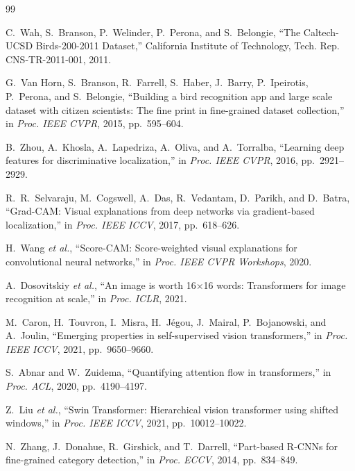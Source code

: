 \documentclass[journal]{IEEEtran}
\begin{document}
\begin{thebibliography}{99}

C.~Wah, S.~Branson, P.~Welinder, P.~Perona, and S.~Belongie,
``The Caltech-UCSD Birds-200-2011 Dataset,''
California Institute of Technology,
Tech. Rep. CNS-TR-2011-001, 2011.

G.~Van Horn, S.~Branson, R.~Farrell, S.~Haber, J.~Barry,
P.~Ipeirotis, P.~Perona, and S.~Belongie,
``Building a bird recognition app and large scale dataset with citizen
scientists: The fine print in fine-grained dataset collection,''
in \emph{Proc. IEEE CVPR}, 2015, pp.~595--604.

B.~Zhou, A.~Khosla, A.~Lapedriza, A.~Oliva, and A.~Torralba,
``Learning deep features for discriminative localization,''
in \emph{Proc. IEEE CVPR}, 2016, pp.~2921--2929.

R.~R.~Selvaraju, M.~Cogswell, A.~Das, R.~Vedantam,
D.~Parikh, and D.~Batra,
``Grad-CAM: Visual explanations from deep networks via gradient-based
localization,''
in \emph{Proc. IEEE ICCV}, 2017, pp.~618--626.

H.~Wang \emph{et al.},
``Score-CAM: Score-weighted visual explanations for convolutional
neural networks,''
in \emph{Proc. IEEE CVPR Workshops}, 2020.

A.~Dosovitskiy \emph{et al.},
``An image is worth 16$\times$16 words: Transformers for image
recognition at scale,''
in \emph{Proc. ICLR}, 2021.

M.~Caron, H.~Touvron, I.~Misra, H.~J\'{e}gou, J.~Mairal,
P.~Bojanowski, and A.~Joulin,
``Emerging properties in self-supervised vision transformers,''
in \emph{Proc. IEEE ICCV}, 2021, pp.~9650--9660.

S.~Abnar and W.~Zuidema,
``Quantifying attention flow in transformers,''
in \emph{Proc. ACL}, 2020, pp.~4190--4197.

Z.~Liu \emph{et al.},
``Swin Transformer: Hierarchical vision transformer using shifted
windows,''
in \emph{Proc. IEEE ICCV}, 2021, pp.~10012--10022.

N.~Zhang, J.~Donahue, R.~Girshick, and T.~Darrell,
``Part-based R-CNNs for fine-grained category detection,''
in \emph{Proc. ECCV}, 2014, pp.~834--849.


\end{thebibliography}
\end{document}
